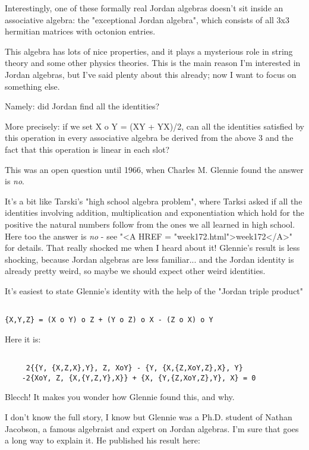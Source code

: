 Interestingly, one of these formally real Jordan algebras doesn't
sit inside an associative algebra: the "exceptional Jordan algebra", 
which consists of all 3x3 hermitian matrices with octonion entries.

This algebra has lots of nice properties, and it plays a mysterious 
role in string theory and some other physics theories.  This is the 
main reason I'm interested in Jordan algebras, but I've said plenty 
about this already; now I want to focus on something else.

Namely: did Jordan find all the identities?  

More precisely: if we set X o Y = (XY + YX)/2, can all the identities 
satisfied by this operation in every associative algebra be derived 
from the above 3 and the fact that this operation is linear in each slot?

This was an open question until 1966, when Charles M. Glennie found 
the answer is \emph{no}.


It's a bit like Tarski's "high school algebra problem", where
Tarksi asked if all the identities involving addition, multiplication
and exponentiation which hold for the positive the natural numbers
follow from the ones we all learned in high school.  Here too the answer
is \emph{no} - see "<A HREF = "week172.html">week172</A>"
for details.  That really shocked me when I heard about it!  Glennie's
result is less shocking, because Jordan algebras are less
familiar... and the Jordan identity is already pretty weird, so maybe we
should expect other weird identities.

It's easiest to state Glennie's identity with the help of
the "Jordan triple product"


\begin{verbatim}

{X,Y,Z} = (X o Y) o Z + (Y o Z) o X - (Z o X) o Y
\end{verbatim}
    
Here it is:


\begin{verbatim}

     2{{Y, {X,Z,X},Y}, Z, XoY} - {Y, {X,{Z,XoY,Z},X}, Y}
    -2{XoY, Z, {X,{Y,Z,Y},X}} + {X, {Y,{Z,XoY,Z},Y}, X} = 0 
\end{verbatim}
    
Blecch!  It makes you wonder how Glennie found this, and why.

I don't know the full story, I know but Glennie was a Ph.D. student of
Nathan Jacobson, a famous algebraist and expert on Jordan algebras.  I'm
sure that goes a long way to explain it.  He published his result here:

